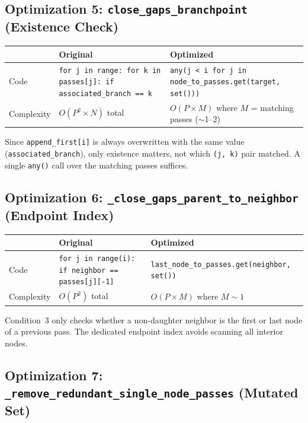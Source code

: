 \documentclass[11pt,a4paper]{article}
\begin{document}
\subsection{Optimization 5: \texttt{close\_gaps\_branchpoint} (Existence Check)}

\begin{table}[H]
\centering
\begin{tabularx}{\textwidth}{lXX}
\toprule
& \textbf{Original} & \textbf{Optimized} \\
\midrule
Code & \texttt{for j in range: for k in passes[j]: if associated\_branch == k} & \texttt{any(j < i for j in node\_to\_passes.get(target, set()))} \\
Complexity & $O(P^2 \times N)$ total & $O(P \times M)$ where $M$ = matching passes ($\sim$1--2) \\
\bottomrule
\end{tabularx}
\end{table}

Since \texttt{append\_first[i]} is always overwritten with the same value (\texttt{associated\_branch}), only existence matters, not which \texttt{(j, k)} pair matched. A single \texttt{any()} call over the matching passes suffices.

\subsection{Optimization 6: \texttt{\_close\_gaps\_parent\_to\_neighbor} (Endpoint Index)}

\begin{table}[H]
\centering
\begin{tabularx}{\textwidth}{lXX}
\toprule
& \textbf{Original} & \textbf{Optimized} \\
\midrule
Code & \texttt{for j in range(i): if neighbor == passes[j][-1]} & \texttt{last\_node\_to\_passes.get(neighbor, set())} \\
Complexity & $O(P^2)$ total & $O(P \times M)$ where $M \sim 1$ \\
\bottomrule
\end{tabularx}
\end{table}

Condition~3 only checks whether a non-daughter neighbor is the first or last node of a previous pass. The dedicated endpoint index avoids scanning all interior nodes.

\subsection{Optimization 7: \texttt{\_remove\_redundant\_single\_node\_passes} (Mutated Set)}
\end{document}
